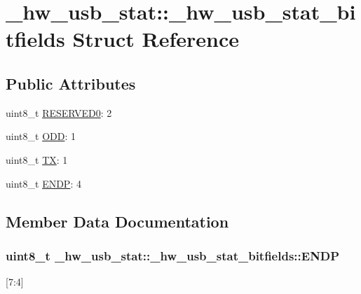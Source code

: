 \hypertarget{struct__hw__usb__stat_1_1__hw__usb__stat__bitfields}{}\section{\+\_\+hw\+\_\+usb\+\_\+stat\+:\+:\+\_\+hw\+\_\+usb\+\_\+stat\+\_\+bitfields Struct Reference}
\label{struct__hw__usb__stat_1_1__hw__usb__stat__bitfields}
\subsection*{Public Attributes}
\begin{DoxyCompactItemize}
\item 
uint8\+\_\+t \hyperlink{struct__hw__usb__stat_1_1__hw__usb__stat__bitfields_a3ac9da2a002b842c76fc8728796897a2}{R\+E\+S\+E\+R\+V\+E\+D0}\+: 2
\item 
uint8\+\_\+t \hyperlink{struct__hw__usb__stat_1_1__hw__usb__stat__bitfields_afa0909dffc33a2ed9e7506ddb6b00367}{O\+DD}\+: 1
\item 
uint8\+\_\+t \hyperlink{struct__hw__usb__stat_1_1__hw__usb__stat__bitfields_aac29a13f58e9fd77fd47043aead477c9}{TX}\+: 1
\item 
uint8\+\_\+t \hyperlink{struct__hw__usb__stat_1_1__hw__usb__stat__bitfields_ad29670c66e041f775be81ca4cd0ec197}{E\+N\+DP}\+: 4
\end{DoxyCompactItemize}


\subsection{Member Data Documentation}
\subsubsection[{\texorpdfstring{E\+N\+DP}{ENDP}}]{\setlength{\rightskip}{0pt plus 5cm}uint8\+\_\+t \+\_\+hw\+\_\+usb\+\_\+stat\+::\+\_\+hw\+\_\+usb\+\_\+stat\+\_\+bitfields\+::\+E\+N\+DP}\hypertarget{struct__hw__usb__stat_1_1__hw__usb__stat__bitfields_ad29670c66e041f775be81ca4cd0ec197}{}\label{struct__hw__usb__stat_1_1__hw__usb__stat__bitfields_ad29670c66e041f775be81ca4cd0ec197}
\mbox{[}7\+:4\mbox{]} 
